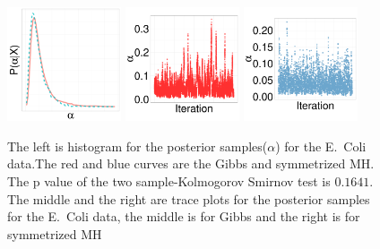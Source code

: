 {  \begin{figure}[H]
  \centering
  \begin{minipage}[!hp]{0.97\linewidth}
    \includegraphics [width=0.30\textwidth, angle=0]{figs/ecoli_ks/ecoli_alphahist_31_3_0_.pdf}
    \includegraphics [width=0.30\textwidth, angle=0]{figs/ecoli_ks/ecoli_alphatraceGBS_31_3_0_.pdf}
    \includegraphics [width=0.30\textwidth, angle=0]{figs/ecoli_ks/ecoli_alphatraceMH_31_3_0_.pdf}
  \end{minipage}

    \caption{The left is histogram for the posterior samples($\alpha$) for the E.\ Coli data.The red and blue curves are the Gibbs and symmetrized MH. The p value of the two sample-Kolmogorov Smirnov test is $ 0.1641$. The middle and the right are trace plots for the posterior samples for the E.\ Coli data, the middle is for Gibbs and the right is for symmetrized MH}
     \label{fig:TRACE_ECOLI}
  \end{figure}

}
